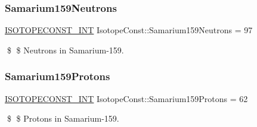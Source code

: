 \subsubsection{\texorpdfstring{Samarium159\+Neutrons}{Samarium159Neutrons}}
{\footnotesize\ttfamily \mbox{\hyperlink{group___isotope_const-_macros_ga5f18360b3e99483a35c32d789e62621c}{I\+S\+O\+T\+O\+P\+E\+C\+O\+N\+S\+T\+\_\+\+I\+NT}} Isotope\+Const\+::\+Samarium159\+Neutrons = 97}

\$ \$ Neutrons in Samarium-\/159. \mbox{\label{group___isotope_const-_samarium-_sm159_gab7c28683c487810b7fed493f2c237b0a}} 
\subsubsection{\texorpdfstring{Samarium159\+Protons}{Samarium159Protons}}
{\footnotesize\ttfamily \mbox{\hyperlink{group___isotope_const-_macros_ga5f18360b3e99483a35c32d789e62621c}{I\+S\+O\+T\+O\+P\+E\+C\+O\+N\+S\+T\+\_\+\+I\+NT}} Isotope\+Const\+::\+Samarium159\+Protons = 62}

\$ \$ Protons in Samarium-\/159. 